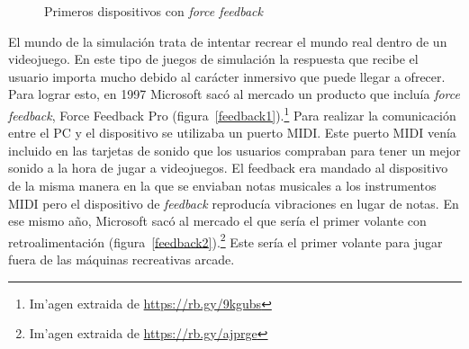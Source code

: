 \begin{figure}[t]
     \hfill
{}
     \caption{Primeros dispositivos con \textit{force feedback}}
     \label{fig:feedback}
   \end{figure}

El mundo de la simulaci\'on trata de intentar recrear el mundo real dentro de un videojuego. En este tipo de juegos de simulaci\'on la respuesta que recibe el usuario importa mucho debido al car\'acter inmersivo que puede llegar a ofrecer. Para lograr esto, en 1997 Microsoft sac\'o al mercado un producto que inclu\'ia \textit{force feedback}, Force Feedback Pro (figura~\ref{feedback1}).\footnote{Im'agen extraida de \url{https://rb.gy/9kgubs}} Para realizar la comunicaci\'on entre el PC y el dispositivo se utilizaba un puerto MIDI. Este puerto MIDI ven\'ia incluido en las tarjetas de sonido que los usuarios compraban para tener un mejor sonido a la hora de jugar a videojuegos. El feedback era mandado al dispositivo de la misma manera en la que se enviaban notas musicales a los instrumentos MIDI pero el dispositivo de \textit{feedback} reproduc\'ia vibraciones en lugar de notas. En ese mismo a\~no, Microsoft sac\'o al mercado el que ser\'ia el primer volante con retroalimentaci\'on (figura~\ref{feedback2}).\footnote{Im'agen extraida de \url{https://rb.gy/ajprge}} Este ser\'ia el primer volante para jugar fuera de las m\'aquinas recreativas arcade.\\



